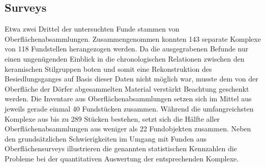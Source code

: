 \begin{multicols}{2}
\subsection{Surveys}

Etwa zwei Drittel der untersuchten Funde stammen von Oberflächenabsammlungen. Zusammengenommen konnten 143 separate Komplexe von 118 Fundstellen herangezogen werden. Da die ausgegrabenen Befunde nur einen ungenügenden Einblick in die chronologischen Relationen zwischen den keramischen Stilgruppen boten und somit eine Rekonstruktion des Besiedlungsganges auf Basis dieser Daten nicht möglich war, musste dem von der Oberfläche der Dörfer abgesammelten Material verstärkt Beachtung geschenkt werden. Die Inventare aus Oberflächenabsammlungen setzen sich im Mittel aus jeweils gerade einmal 40 Fundstücken zusammen. Während die umfangreichsten Komplexe aus bis zu 289 Stücken bestehen, setzt sich die Hälfte aller Oberflächenabsammlungen aus weniger als 22 Fundobjekten zusammen. Neben den grundsätzlichen Schwierigkeiten im Umgang mit Funden aus Oberflächensurveys illustrieren die genannten statistischen Kennzahlen die Probleme bei der quantitativen Auswertung der entsprechenden Komplexe.


\end{multicols}
